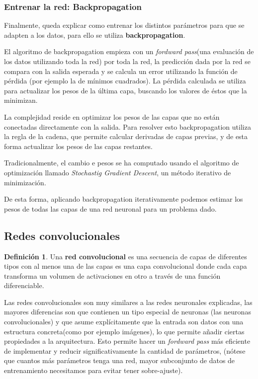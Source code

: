 \documentclass[12,twoside]{TFG-GM}
\theoremstyle{definition}
\newtheorem{definition}[theorem]{Definición}
\theoremstyle{remark}
\begin{document}


\subsubsection{Entrenar la red: Backpropagation}
Finalmente, queda explicar como entrenar los distintos parámetros para que se adapten a los datos, para ello se utiliza \textbf{backpropagation}.

El algoritmo de backpropagation empieza con un \textit{fordward pass}(una evaluación de los datos utilizando toda la red) por toda la red, la predicción dada por la red se compara con la salida esperada 
y se calcula un error utilizando la función de pérdida (por ejemplo la de mínimos cuadrados). La pérdida calculada se utiliza para actualizar los pesos de la última capa, buscando los valores de éstos que la minimizan.

La complejidad reside en optimizar los pesos de las capas que no están conectadas directamente con la salida. Para resolver esto backpropagation utiliza la regla de la cadena, que permite calcular derivadas de capas previas, y de esta forma actualizar los pesos de las capas restantes. 

Tradicionalmente, el cambio e pesos se ha computado usando el algoritmo de optimización llamado \textit{ Stochastig Gradient Descent}, un método iterativo de minimización.

De esta forma, aplicando backpropagation iterativamente podemos estimar los pesos de todas las capas de una red neuronal para un problema dado.




\newpage

\subsection{Redes convolucionales}
\begin{definition}
Una \textbf{red convolucional} es una secuencia de capas de diferentes tipos con al menos una de las capas es una capa convolucional donde cada capa transforma un volumen de activaciones en otro a través de una función diferenciable. 
\end{definition}
Las redes convolucionales son muy similares a las redes neuronales explicadas, las mayores diferencias son que contienen un tipo especial de neuronas (las neuronas convolucionales) y que asume explícitamente que la entrada son datos con una estructura concreta(como por ejemplo imágenes), lo que permite añadir ciertas propiedades a la arquitectura. Esto permite hacer un \textit{fordward pass} más eficiente de implementar y reducir significativamente la cantidad de parámetros, (nótese que cuantos más parámetros tenga una red, mayor subconjunto de datos de entrenamiento necesitamos para evitar tener sobre-ajuste).
\end{document}

